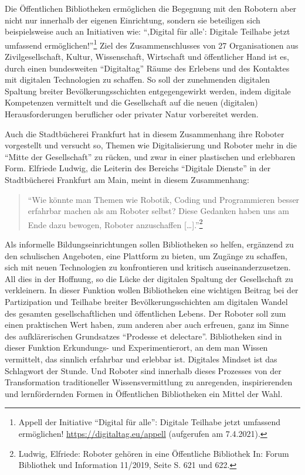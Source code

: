 \documentclass[a4paper,
fontsize=11pt,
oneside,
numbers=noperiodatend,
parskip=half-,
bibliography=totoc,
final
]{scrartcl}
\begin{document}
Die Öffentlichen Bibliotheken ermöglichen die Begegnung mit den Robotern
aber nicht nur innerhalb der eigenen Einrichtung, sondern sie beteiligen
sich beispielsweise auch an Initiativen wie: \enquote{‚Digital für
alle': Digitale Teilhabe jetzt umfassend ermöglichen!}\footnote{Appell
  der Initiative \enquote{Digital für alle}: Digitale Teilhabe jetzt
  umfassend ermöglichen! \url{https://digitaltag.eu/appell} (aufgerufen
  am 7.4.2021).} Ziel des Zusammenschlusses von 27 Organisationen aus
Zivilgesellschaft, Kultur, Wissenschaft, Wirtschaft und öffentlicher
Hand ist es, durch einen bundesweiten \enquote{Digitaltag} Räume des
Erlebens und des Kontaktes mit digitalen Technologien zu schaffen. So
soll der zunehmenden digitalen Spaltung breiter Bevölkerungsschichten
entgegengewirkt werden, indem digitale Kompetenzen vermittelt und die
Gesellschaft auf die neuen (digitalen) Herausforderungen beruflicher
oder privater Natur vorbereitet werden.

Auch die Stadtbücherei Frankfurt hat in diesem Zusammenhang ihre Roboter
vorgestellt und versucht so, Themen wie Digitalisierung und Roboter mehr
in die \enquote{Mitte der Gesellschaft} zu rücken, und zwar in einer
plastischen und erlebbaren Form. Elfriede Ludwig, die Leiterin des
Bereichs \enquote{Digitale Dienste} in der Stadtbücherei Frankfurt am Main,
meint in diesem Zusammenhang: 

\begin{quote}
\enquote{Wie könnte man Themen wie
Robotik, Coding und Programmieren besser erfahrbar machen als am Roboter
selbst? Diese Gedanken haben uns am Ende dazu bewogen, Roboter
anzuschaffen {[}\ldots{]}.}\footnote{Ludwig, Elfriede: Roboter gehören
  in eine Öffentliche Bibliothek In: Forum Bibliothek und Information
  11/2019, Seite S. 621 und 622.} 
 \end{quote}
  
Als informelle Bildungseinrichtungen
sollen Bibliotheken so helfen, ergänzend zu den schulischen Angeboten,
eine Plattform zu bieten, um Zugänge zu schaffen, sich mit neuen
Technologien zu konfrontieren und kritisch auseinanderzusetzen. All dies
in der Hoffnung, so die Lücke der digitalen Spaltung der Gesellschaft zu
verkleinern. In dieser Funktion wollen Bibliotheken eine wichtigen
Beitrag bei der Partizipation und Teilhabe breiter Bevölkerungsschichten
am digitalen Wandel des gesamten gesellschaftlichen und öffentlichen
Lebens. Der Roboter soll zum einen praktischen Wert haben, zum anderen
aber auch erfreuen, ganz im Sinne des aufklärerischen Grundsatzes
\enquote{Prodesse et delectare}. Bibliotheken sind in dieser Funktion
Erkundungs- und Experimentierort, an dem man Wissen vermittelt, das
sinnlich erfahrbar und erlebbar ist. Digitales Mindset ist das
Schlagwort der Stunde. Und Roboter sind innerhalb dieses Prozesses von
der Transformation traditioneller Wissensvermittlung zu anregenden,
inspirierenden und lernfördernden Formen in Öffentlichen Bibliotheken
ein Mittel der Wahl.
\end{document}
